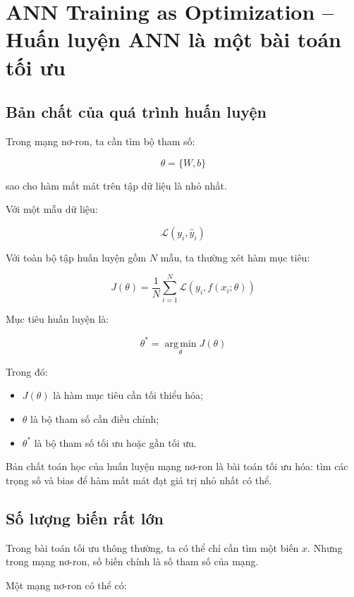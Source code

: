 \section{ANN Training as Optimization -- Huấn luyện ANN là một bài toán tối ưu}

\subsection{Bản chất của quá trình huấn luyện}

Trong mạng nơ-ron, ta cần tìm bộ tham số:

\[
    \theta = \{W,b\}
\]

sao cho hàm mất mát trên tập dữ liệu là nhỏ nhất.

Với một mẫu dữ liệu:

\[
    \mathcal{L}(y_i,\hat{y}_i)
\]

Với toàn bộ tập huấn luyện gồm $N$ mẫu, ta thường xét hàm mục tiêu:

\[
    J(\theta)
    =
    \frac{1}{N}
    \sum_{i=1}^{N}
    \mathcal{L}\left(y_i, f(x_i;\theta)\right)
\]

Mục tiêu huấn luyện là:

\[
    \theta^*
    =
    \operatorname*{arg\,min}_{\theta} J(\theta)
\]

Trong đó:

\begin{itemize}
    \item $J(\theta)$ là hàm mục tiêu cần tối thiểu hóa;
    \item $\theta$ là bộ tham số cần điều chỉnh;
    \item $\theta^*$ là bộ tham số tối ưu hoặc gần tối ưu.
\end{itemize}

\begin{ghinho}
Bản chất toán học của huấn luyện mạng nơ-ron là bài toán tối ưu hóa: tìm các trọng số và bias để hàm mất mát đạt giá trị nhỏ nhất có thể.
\end{ghinho}

\subsection{Số lượng biến rất lớn}

Trong bài toán tối ưu thông thường, ta có thể chỉ cần tìm một biến $x$. Nhưng trong mạng nơ-ron, số biến chính là số tham số của mạng.

Một mạng nơ-ron có thể có:

